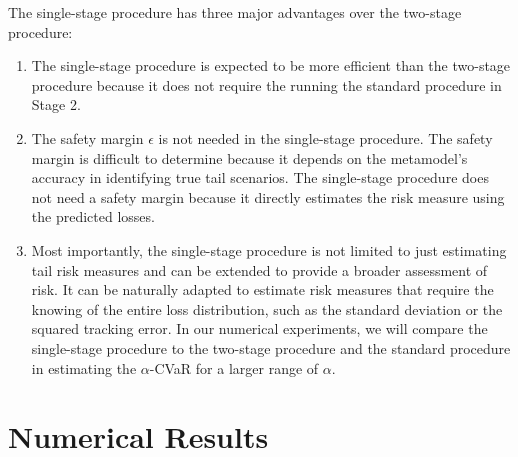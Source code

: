 The single-stage procedure has three major advantages over the two-stage procedure:
\begin{enumerate}
    \item The single-stage procedure is expected to be more efficient than the two-stage procedure because it does not require the running the standard procedure in Stage 2.
    \item The safety margin $\epsilon$ is not needed in the single-stage procedure.
    The safety margin is difficult to determine because it depends on the metamodel's accuracy in identifying true tail scenarios.
    The single-stage procedure does not need a safety margin because it directly estimates the risk measure using the predicted losses.
    \item Most importantly, the single-stage procedure is not limited to just estimating tail risk measures and can be extended to provide a broader assessment of risk. 
    It can be naturally adapted to estimate risk measures that require the knowing of the entire loss distribution, such as the standard deviation or the squared tracking error.
    In our numerical experiments, we will compare the single-stage procedure to the two-stage procedure and the standard procedure in estimating the $\alpha$-CVaR for a larger range of $\alpha$.
\end{enumerate}


\section{Numerical Results} \label{sec2:numerical}


